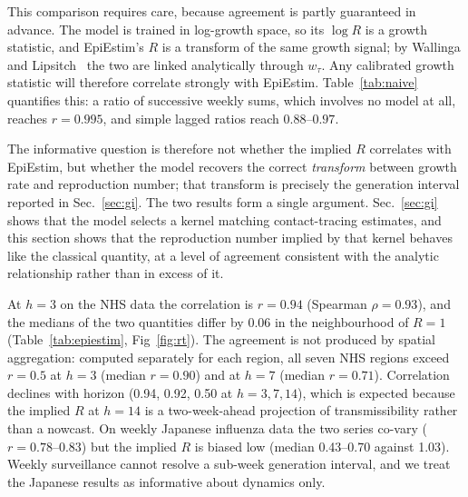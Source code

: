 \documentclass[10pt,letterpaper]{article}
\begin{document}
This comparison requires care, because agreement is partly guaranteed in
advance. The model is trained in log-growth space, so its $\log R$ is a growth
statistic, and EpiEstim's $R$ is a transform of the same growth signal; by
Wallinga and Lipsitch~\cite{wallinga2007generation} the two are linked
analytically through $w_\tau$. Any calibrated growth statistic will therefore
correlate strongly with EpiEstim. Table~\ref{tab:naive} quantifies this: a
ratio of successive weekly sums, which involves no model at all, reaches
$r=0.995$, and simple lagged ratios reach $0.88$--$0.97$.

\begin{table}[ht]
\centering
\caption{Correlation with EpiEstim of model-free growth statistics, on the same
series and split. Strong correlation with EpiEstim is expected of any growth
statistic and is not by itself evidence of learned epidemiology.}

\label{tab:naive}
\end{table}

The informative question is therefore not whether the implied $R$ correlates
with EpiEstim, but whether the model recovers the correct \emph{transform}
between growth rate and reproduction number; that transform is precisely the
generation interval reported in Sec.~\ref{sec:gi}. The two results form a
single argument. Sec.~\ref{sec:gi} shows that the model selects a kernel
matching contact-tracing estimates, and this section shows that the
reproduction number implied by that kernel behaves like the classical
quantity, at a level of agreement consistent with the analytic relationship
rather than in excess of it.

\begin{table}[ht]
\centering
\caption{Agreement between the implied $R$ and EpiEstim on the validation
split (learned arm, seed 42). The final column gives the fraction of days on
which the two quantities fall on the same side of $R=1$.}

\label{tab:epiestim}
\end{table}

At $h=3$ on the NHS data the correlation is $r=0.94$ (Spearman $\rho=0.93$),
and the medians of the two quantities differ by 0.06 in the neighbourhood of
$R=1$ (Table~\ref{tab:epiestim}, Fig~\ref{fig:rt}). The agreement is not
produced by spatial aggregation: computed separately for each region, all
seven NHS regions exceed $r=0.5$ at $h=3$ (median $r=0.90$) and at $h=7$
(median $r=0.71$). Correlation declines with horizon (0.94, 0.92, 0.50 at
$h=3,7,14$), which is expected because the implied $R$ at $h=14$ is a
two-week-ahead projection of transmissibility rather than a nowcast. On
weekly Japanese influenza data the two series co-vary ($r=0.78$--$0.83$) but
the implied $R$ is biased low (median 0.43--0.70 against 1.03). Weekly
surveillance cannot resolve a sub-week generation interval, and we treat the
Japanese results as informative about dynamics only.
\end{document}
